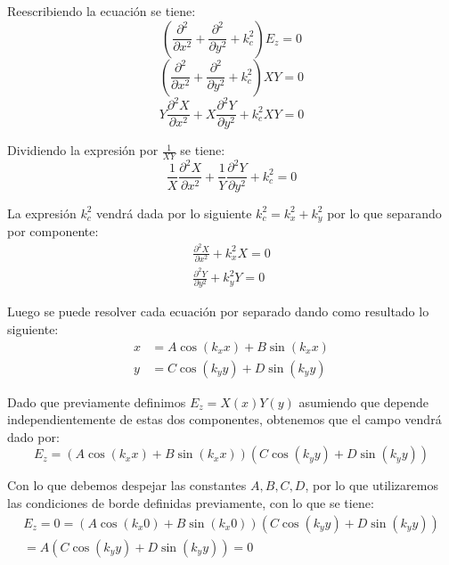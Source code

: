 \documentclass[
  11pt,
  letterpaper,
   addpoints,
   answers
  ]{exam}
\begin{document}
\begin{questions}
\begin{solution}
Reescribiendo la ecuación se tiene:
\begin{equation}
    \left( \frac{\partial^2}{\partial x^2} + \frac{\partial^2}{\partial y^2} + k_c^2 \right) E_z = 0 \tag{30}
\end{equation}
\begin{equation}
    \left( \frac{\partial^2}{\partial x^2} + \frac{\partial^2}{\partial y^2} + k_c^2 \right) XY = 0 \tag{31}
\end{equation}
\begin{equation}
    Y \frac{\partial^2 X}{\partial x^2} + X \frac{\partial^2 Y}{\partial y^2} + k_c^2 XY = 0 \tag{32}
\end{equation}

Dividiendo la expresión por $\frac{1}{XY}$ se tiene:
\begin{equation}
    \frac{1}{X}\frac{\partial^2 X}{\partial x^2} + \frac{1}{Y}\frac{\partial^2 Y}{\partial y^2} + k_c^2 = 0 \tag{33}
\end{equation}

La expresión $k_c^2$ vendrá dada por lo siguiente $k_c^2 = k_x^2 + k_y^2$ por lo que separando por componente:
\begin{align}
    \frac{\partial^2 X}{\partial x^2} + k_x^2 X = 0 \tag{34} \\
    \frac{\partial^2 Y}{\partial y^2} + k_y^2 Y = 0
\end{align}

Luego se puede resolver cada ecuación por separado dando como resultado lo siguiente:
\begin{align}
    x &= A \cos(k_x x) + B \sin(k_x x) \\
    y &= C \cos(k_y y) + D \sin(k_y y) \tag{35}
\end{align}

Dado que previamente definimos $E_z = X(x)Y(y)$ asumiendo que depende independientemente de estas dos componentes, obtenemos que el campo vendrá dado por:
\begin{equation}
    E_z = (A \cos(k_x x) + B \sin(k_x x))(C \cos(k_y y) + D \sin(k_y y)) \tag{36}
\end{equation}

Con lo que debemos despejar las constantes $A, B, C, D$, por lo que utilizaremos las condiciones de borde definidas previamente, con lo que se tiene:
\begin{align}
    E_z = 0 = (A \cos(k_x 0) + B \sin(k_x 0))(C \cos(k_y y) + D \sin(k_y y)) \tag{37} \\
    = A(C \cos(k_y y) + D \sin(k_y y)) = 0 \tag{38}
\end{align}


\end{solution}
\end{questions}
\end{document}
